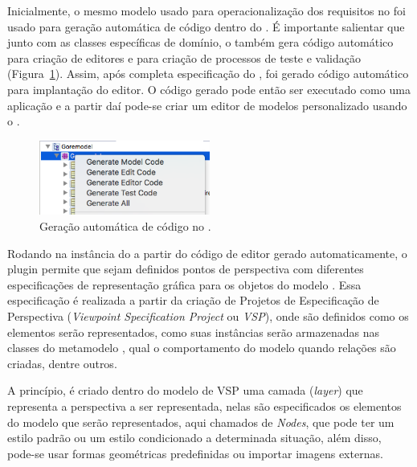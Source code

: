 Inicialmente, o mesmo modelo \ecore usado para operacionalização dos requisitos no \zanshin foi usado para geração automática de código dentro do \eclipse \emf. É importante salientar que junto com as classes específicas de domínio, o \emf também gera código automático para criação de editores e para criação de processos de teste e validação (Figura~\ref{figura-gera-codigo}). Assim, após completa especificação do \ecore, foi gerado código automático para implantação do editor. O código gerado pode então ser executado como uma aplicação \eclipse e a partir daí pode-se criar um editor de modelos personalizado usando o \sirius.


\begin{figure}
	\centering
	\includegraphics[width=0.5\textwidth]{figuras/unagi/exemplo-gera-codigo.png}
	\caption{Geração automática de código no \eclipse.}
	\label{figura-gera-codigo}
\end{figure}

Rodando na instância do \eclipse a partir do código de editor gerado automaticamente, o plugin \sirius permite que sejam definidos pontos de perspectiva com diferentes especificações de representação gráfica para os objetos do modelo \ecore. Essa especificação é realizada a partir da criação de Projetos de Especificação de Perspectiva (\textit{Viewpoint Specification Project} ou \textit{VSP}), onde são definidos como os elementos serão representados, como suas instâncias serão armazenadas nas classes do metamodelo \ecore, qual o comportamento do modelo quando relações são criadas, dentre outros.

A princípio, é criado dentro do modelo de VSP uma camada (\textit{layer}) que representa a perspectiva a ser representada, nelas são especificados os elementos do modelo \ecore que serão representados, aqui chamados de \textit{Nodes}, que pode ter um estilo padrão ou um estilo condicionado a determinada situação, além disso, pode-se usar formas geométricas predefinidas ou importar imagens externas. 

